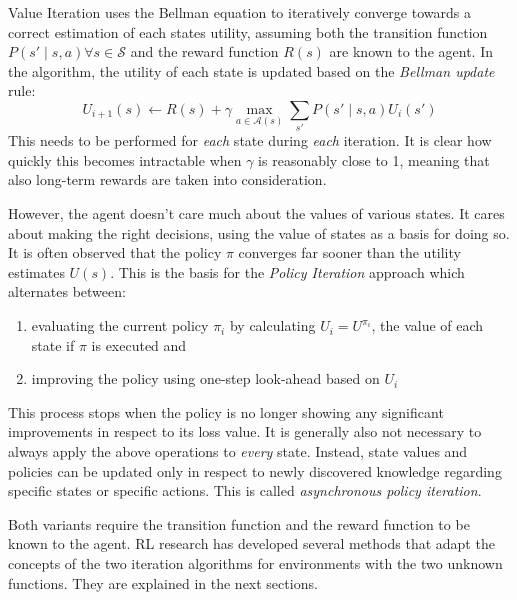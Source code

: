 Value Iteration uses the Bellman equation to iteratively converge towards a correct estimation of each states utility,
assuming both the transition function $P(s' \mid s,a) \forall s \in \mathcal{S}$ and the reward function $R(s)$ are
known to the agent.
In the algorithm, the utility of each state is updated based on the \emph{Bellman update} rule:
\begin{equation}
    U_{i+1}(s) \gets R(s) + \gamma \max_{a \in \mathcal{A}(s)} \sum_{s'}{P(s' \mid s,a) U_i(s')}
\end{equation}
This needs to be performed for \emph{each} state during \emph{each} iteration. It is clear how quickly this becomes
intractable when $\gamma$ is reasonably close to 1, meaning that also long-term rewards are taken into
consideration.

However, the agent doesn't care much about the values of various states. It cares about making the right
decisions, using the value of states as a basis for doing so. It is often observed that the policy $\pi$ converges far
sooner than the utility estimates $U(s)$. This is the basis for the \emph{Policy Iteration} approach which alternates
between:
\begin{enumerate}
    \item evaluating the current policy $\pi_i$ by calculating $U_i=U^{\pi_i}$, the value of each state if $\pi$ is
        executed and
    \item improving the policy using one-step look-ahead based on $U_i$
\end{enumerate}

\noindent This process stops when the policy is no longer showing any significant improvements in respect to its loss value. It is
generally also not necessary to always apply the above operations to \emph{every} state. Instead, state values and
policies can be updated only in respect to newly discovered knowledge regarding specific states or specific actions.
This is called \emph{asynchronous policy iteration}.

Both variants require the transition function and the reward function to be known to the agent. \ac{RL} research has
developed several methods that adapt the concepts of the two iteration algorithms for environments with the two unknown
functions. They are explained in the next sections.

